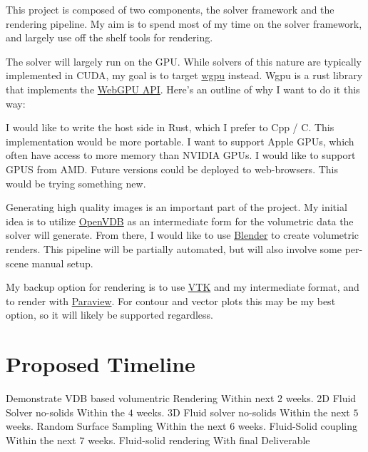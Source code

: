 \documentclass{article}
\begin{document}
This project is composed of two components, 
the solver framework and the rendering pipeline.
My aim is to spend most of my time on the solver framework,
and largely use off the shelf tools for 
rendering.

The solver will largely run on the GPU.
While solvers of this nature are typically implemented in CUDA,
my goal is to target \href{https://wgpu.rs}{wgpu} instead.
Wgpu is a rust library that implements the \href{https://developer.mozilla.org/en-US/docs/Web/API/WebGPU_API}{WebGPU API}.
Here's an outline of why I want to do it this way:
\begin{outline}
  \1 I would like to write the host side in Rust, which I prefer to Cpp / C.
  \1 This implementation would be more portable.
    \2 I want to support Apple GPUs, which often have access to more memory than NVIDIA GPUs.
    \2 I would like to support GPUS from AMD.
    \2 Future versions could be deployed to web-browsers.
  \1 This would be trying something new.
\end{outline}

Generating high quality images is an important part of the project.
My initial idea is to utilize \href{https://www.openvdb.org}{OpenVDB}
as an intermediate form for the volumetric data the solver will generate.
From there, I would like to use \href{https://www.blender.org}{Blender}
to create volumetric renders.
This pipeline will be partially automated,
but will also involve some per-scene manual setup.

My backup option for rendering is to use \href{https://vtk.org}{VTK} and my intermediate format,
and to render with \href{https://www.paraview.org}{Paraview}.
For contour and vector plots this may be my best option, so it will likely be supported
regardless.

\section{Proposed Timeline}

\begin{outline}
  \1 Demonstrate VDB based volumentric Rendering
    \2 Within next $2$ weeks.
  \1 2D Fluid Solver no-solids
    \2 Within the $4$ weeks. 
  \1 3D Fluid solver no-solids
    \2 Within the next $5$ weeks.
  \1 Random Surface Sampling
    \2 Within the next $6$ weeks.
  \1 Fluid-Solid coupling
    \2 Within the next $7$ weeks.
  \1 Fluid-solid rendering
    \2 With final Deliverable
\end{outline}

\printbibliography
\end{document}
